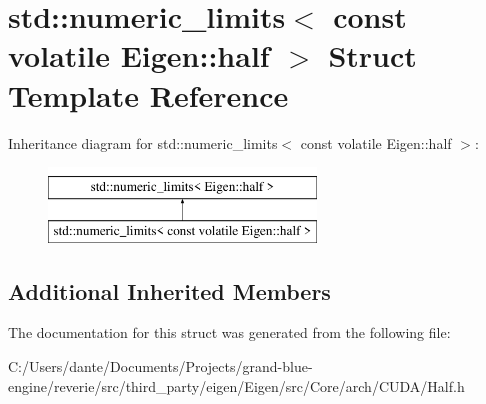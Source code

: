 \hypertarget{structstd_1_1numeric__limits_3_01const_01volatile_01_eigen_1_1half_01_4}{}\section{std\+::numeric\+\_\+limits$<$ const volatile Eigen\+::half $>$ Struct Template Reference}
\label{structstd_1_1numeric__limits_3_01const_01volatile_01_eigen_1_1half_01_4}
Inheritance diagram for std\+::numeric\+\_\+limits$<$ const volatile Eigen\+::half $>$\+:\begin{figure}[H]
\begin{center}
\leavevmode
\includegraphics[height=2.000000cm]{structstd_1_1numeric__limits_3_01const_01volatile_01_eigen_1_1half_01_4}
\end{center}
\end{figure}
\subsection*{Additional Inherited Members}


The documentation for this struct was generated from the following file\+:\begin{DoxyCompactItemize}
\item 
C\+:/\+Users/dante/\+Documents/\+Projects/grand-\/blue-\/engine/reverie/src/third\+\_\+party/eigen/\+Eigen/src/\+Core/arch/\+C\+U\+D\+A/Half.\+h\end{DoxyCompactItemize}
